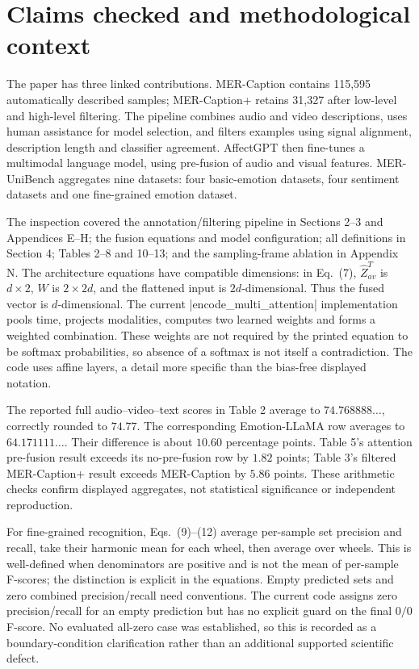 \documentclass[10pt]{article}
\begin{document}
\section*{Claims checked and methodological context}
The paper has three linked contributions. MER-Caption contains 115,595 automatically described samples; MER-Caption+ retains 31,327 after low-level and high-level filtering. The pipeline combines audio and video descriptions, uses human assistance for model selection, and filters examples using signal alignment, description length and classifier agreement. AffectGPT then fine-tunes a multimodal language model, using pre-fusion of audio and visual features. MER-UniBench aggregates nine datasets: four basic-emotion datasets, four sentiment datasets and one fine-grained emotion dataset.\par
The inspection covered the annotation/filtering pipeline in Sections 2–3 and Appendices E–H; the fusion equations and model configuration; all definitions in Section 4; Tables 2–8 and 10–13; and the sampling-frame ablation in Appendix N. The architecture equations have compatible dimensions: in Eq. (7), \(\widehat Z_{av}^{T}\) is \(d\times2\), \(W\) is \(2\times2d\), and the flattened input is \(2d\)-dimensional. Thus the fused vector is \(d\)-dimensional. The current |encode\_multi\_attention| implementation pools time, projects modalities, computes two learned weights and forms a weighted combination. These weights are not required by the printed equation to be softmax probabilities, so absence of a softmax is not itself a contradiction. The code uses affine layers, a detail more specific than the bias-free displayed notation.\par
The reported full audio–video–text scores in Table 2 average to \(74.768888\ldots\), correctly rounded to \(74.77\). The corresponding Emotion-LLaMA row averages to \(64.171111\ldots\). Their difference is about \(10.60\) percentage points. Table 5’s attention pre-fusion result exceeds its no-pre-fusion row by \(1.82\) points; Table 3’s filtered MER-Caption+ result exceeds MER-Caption by \(5.86\) points. These arithmetic checks confirm displayed aggregates, not statistical significance or independent reproduction.\par
For fine-grained recognition, Eqs. (9)–(12) average per-sample set precision and recall, take their harmonic mean for each wheel, then average over wheels. This is well-defined when denominators are positive and is not the mean of per-sample F-scores; the distinction is explicit in the equations. Empty predicted sets and zero combined precision/recall need conventions. The current code assigns zero precision/recall for an empty prediction but has no explicit guard on the final \(0/0\) F-score. No evaluated all-zero case was established, so this is recorded as a boundary-condition clarification rather than an additional supported scientific defect.\par
\end{document}
